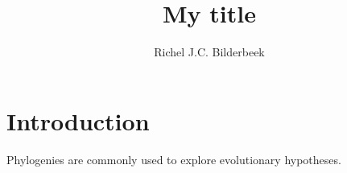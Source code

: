 \documentclass{article}
\title{My title}
\author{Richel J.C. Bilderbeek}
\begin{document}
\maketitle

\section{Introduction}

Phylogenies are commonly used to explore evolutionary hypotheses.
\end{document}
